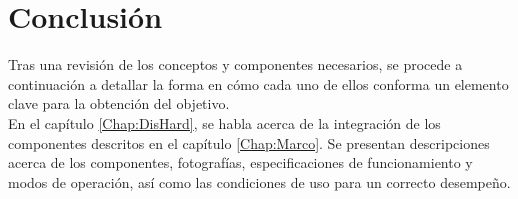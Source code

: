 \section{Conclusión}

Tras una revisión de los conceptos y componentes necesarios, se procede a continuación a detallar la forma en cómo cada uno de ellos conforma un elemento clave para la obtención del objetivo.\\

En el capítulo \ref{Chap:DisHard}, se habla acerca de la integración de los componentes descritos en el capítulo \ref{Chap:Marco}. Se presentan descripciones acerca de los componentes, fotografías, especificaciones de funcionamiento y modos de operación, así como las condiciones de uso para un correcto desempeño. 